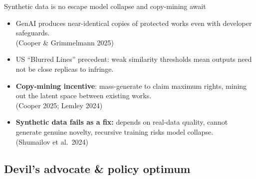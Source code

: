 \documentclass[aspectratio=169,11pt]{beamer}
\begin{document}
\begin{frame}{Synthetic data is no escape \textemdash{} model collapse and copy-mining await}
\vspace{0.2cm}
\begin{itemize}
\item GenAI produces \alert{near-identical copies} of protected works even with developer safeguards.\\
{\footnotesize\textcolor{WarmGray}{(Cooper \& Grimmelmann 2025)}}
\item US ``Blurred Lines'' precedent: \alert{weak similarity thresholds} mean outputs need not be close replicas to infringe.
\item \textbf{Copy-mining incentive}: mass-generate to claim maximum rights, mining out the latent space between existing works.\\
{\footnotesize\textcolor{WarmGray}{(Cooper 2025; Lemley 2024)}}
\item \textbf{Synthetic data fails as a fix:} depends on real-data quality, cannot generate genuine novelty, recursive training risks \alert{model collapse}.\\
{\footnotesize\textcolor{WarmGray}{(Shumailov et al.\ 2024)}}
\end{itemize}
\end{frame}

\subsection{Devil's advocate \& policy optimum}
\end{document}
